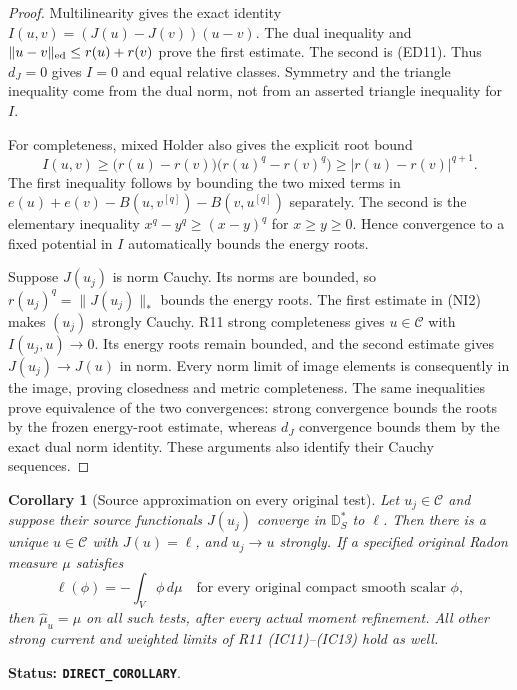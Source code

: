 \documentclass[11pt,a4paper]{article}
\numberwithin{equation}{section}
\newtheorem{corollary}[theorem]{Corollary}
\theoremstyle{definition}
\theoremstyle{remark}
\begin{document}
\begin{proof}
Multilinearity gives the exact identity
$I(u,v)=(J(u)-J(v))(u-v)$. The dual inequality and
$\|u-v\|_{\rm ed}\leq r(u)+r(v)$ prove the first estimate.
The second is (ED11). Thus $d_J=0$ gives $I=0$ and equal
relative classes. Symmetry and the triangle inequality come
from the dual norm, not from an asserted triangle inequality
for $I$.

For completeness, mixed Holder also gives the explicit root bound
\[
 I(u,v)\geq\bigl(r(u)-r(v)\bigr)
                   \bigl(r(u)^q-r(v)^q\bigr)
                \geq|r(u)-r(v)|^{q+1}.
\]
The first inequality follows by bounding the two mixed terms in
$e(u)+e(v)-B(u,v^{[q]})-B(v,u^{[q]})$ separately. The second
is the elementary inequality $x^q-y^q\geq(x-y)^q$ for
$x\geq y\geq0$. Hence convergence to a fixed potential in
$I$ automatically bounds the energy roots.

Suppose $J(u_j)$ is norm Cauchy. Its norms are bounded, so
$r(u_j)^q=\|J(u_j)\|_*$ bounds the energy roots. The first
estimate in (NI2) makes $(u_j)$ strongly Cauchy. R11 strong
completeness gives $u\in\mathscr C$ with $I(u_j,u)\to0$.
Its energy roots remain bounded, and the second estimate gives
$J(u_j)\to J(u)$ in norm. Every norm limit of image elements
is consequently in the image, proving closedness and metric
completeness. The same inequalities prove equivalence of the
two convergences: strong convergence bounds the roots by the
frozen energy-root estimate, whereas $d_J$ convergence bounds
them by the exact dual norm identity. These arguments also
identify their Cauchy sequences.
\end{proof}

\begin{corollary}[Source approximation on every original test]
\label{cor:r12-original-source-approximation}
Let $u_j\in\mathscr C$ and suppose their source functionals
$J(u_j)$ converge in $\mathbb D_S^*$ to $\ell$. Then there is
a unique $u\in\mathscr C$ with $J(u)=\ell$, and $u_j\to u$
strongly. If a specified original Radon measure $\mu$ satisfies
\[
                 \ell(\phi)=-\int_V\phi\,d\mu
            \quad\text{for every original compact smooth scalar }\phi,
 \tag{NI3}
\]
then $\widehat\mu_u=\mu$ on all such tests, after every actual
moment refinement. All other strong current and weighted limits
of R11 (IC11)--(IC13) hold as well.
\end{corollary}

\noindent\textbf{Status: \texttt{DIRECT\_COROLLARY}}.
\end{document}
